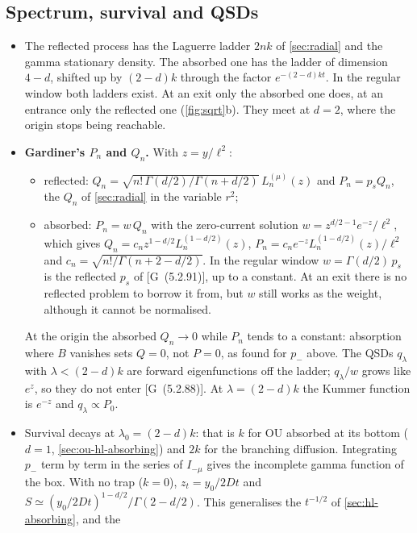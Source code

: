 \documentclass[11pt]{article}
\numberwithin{equation}{section}
\newcommand{\G}[1]{[G~(#1)]}
\begin{document}
\subsection{Spectrum, survival and QSDs}

\begin{itemize}
  \item The reflected process has the Laguerre ladder $2nk$ of \cref{sec:radial} and the gamma stationary density.
        The absorbed one has the ladder of dimension $4-d$, shifted up by $(2-d)k$ through the factor $e^{-(2-d)kt}$.
        In the regular window both ladders exist. At an exit only the absorbed one does, at an entrance only the
        reflected one (\cref{fig:sqrt}b). They meet at $d=2$, where the origin stops being reachable.
  \item \textbf{Gardiner's $P_n$ and $Q_n$.} With $z=y/\ell^2$:
        \begin{itemize}
          \item reflected: $Q_n=\sqrt{n!\,\Gamma(d/2)/\Gamma(n+d/2)}\,L_n^{(\mu)}(z)$ and $P_n=p_sQ_n$, the $Q_n$ of
                \cref{sec:radial} in the variable $r^2$;
          \item absorbed: $P_n=w\,Q_n$ with the zero-current solution $w=z^{d/2-1}e^{-z}/\ell^2$, which gives
                $Q_n=c_nz^{1-d/2}L_n^{(1-d/2)}(z)$, $P_n=c_ne^{-z}L_n^{(1-d/2)}(z)/\ell^2$ and $c_n=\sqrt{n!/\Gamma(n+2-d/2)}$.
                In the regular window $w=\Gamma(d/2)\,p_s$ is the reflected $p_s$ of \G{5.2.91}, up to a constant. At an
                exit there is no reflected problem to borrow it from, but $w$ still works as the weight, although
                it cannot be normalised.
        \end{itemize}
        At the origin the absorbed $Q_n\to0$ while $P_n$ tends to a constant: absorption where $B$ vanishes sets
        $Q=0$, not $P=0$, as found for $p_-$ above. The QSDs $q_\lambda$ with $\lambda<(2-d)k$ are forward
        eigenfunctions off the ladder; $q_\lambda/w$ grows like $e^{z}$, so they do not enter \G{5.2.88}. At
        $\lambda=(2-d)k$ the Kummer function is $e^{-z}$ and $q_\lambda\propto P_0$.
  \item Survival decays at $\lambda_0=(2-d)k$: that is $k$ for OU absorbed at its bottom ($d=1$,
        \cref{sec:ou-hl-absorbing}) and $2k$ for the branching diffusion. Integrating $p_-$ term by term in the series of
        $I_{-\mu}$ gives the incomplete gamma function of the box. With no trap ($k=0$), $z_t=y_0/2Dt$ and
        $S\simeq(y_0/2Dt)^{1-d/2}/\Gamma(2-d/2)$. This generalises the $t^{-1/2}$ of \cref{sec:hl-absorbing}, and the

\end{itemize}
\end{document}
